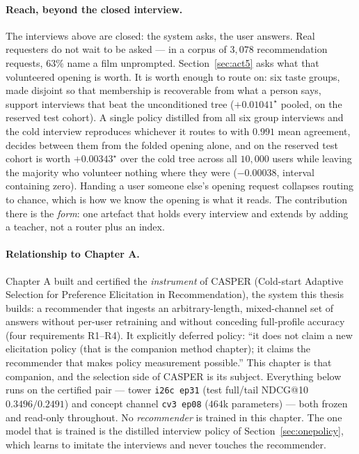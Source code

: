 \documentclass[11pt]{article}
\begin{document}
\paragraph{Reach, beyond the closed interview.} The interviews above are closed: the system asks, the user
answers. Real requesters do not wait to be asked --- in a corpus of $3{,}078$ recommendation
requests, $63\%$ name a film unprompted. Section~\ref{sec:act5} asks what that volunteered opening is
worth. It is worth enough to route on: six taste groups, made disjoint so that membership is
recoverable from what a person says, support interviews that beat the unconditioned tree
($+0.01041^\star$ pooled, on the reserved test cohort). A single policy distilled from all six group interviews and the cold
interview reproduces whichever it routes to with $0.991$ mean agreement, decides between them from
the folded opening alone, and on the reserved test cohort is worth $+0.00343^\star$ over the cold
tree across all $10{,}000$ users while leaving the majority who volunteer nothing where they were
($-0.00038$, interval containing zero). Handing a user someone else's opening request collapses
routing to chance, which is how we know the opening is what it reads. The contribution there is the
\emph{form}: one artefact that holds every interview and extends by adding a teacher, not a router
plus an index.

\paragraph{Relationship to Chapter A.} Chapter A built and certified the \emph{instrument} of CASPER
(Cold-start Adaptive Selection for Preference Elicitation in Recommendation), the system this thesis
builds: a
recommender that ingests an arbitrary-length, mixed-channel set of answers without per-user
retraining and without conceding full-profile accuracy (four requirements R1--R4). It explicitly
deferred policy: ``it does not claim a new elicitation policy (that is the companion method
chapter); it claims the recommender that makes policy measurement possible.'' This chapter is that
companion, and the selection side of CASPER is its subject. Everything below runs on the certified pair --- tower \texttt{i26c ep31} (test full/tail
NDCG@10 $0.3496/0.2491$) and concept channel \texttt{cv3 ep08} ($464$k parameters) --- both frozen
and read-only throughout. No \emph{recommender} is trained in this chapter. The one model that is
trained is the distilled interview policy of Section~\ref{sec:onepolicy}, which learns to imitate
the interviews and never touches the recommender.
\end{document}
